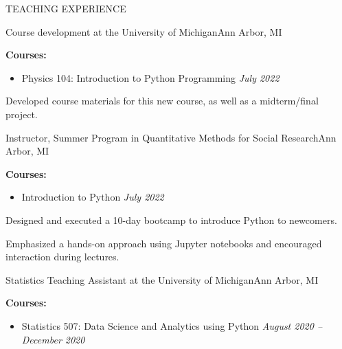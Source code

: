 \documentclass{resume} %
\begin{document}
\begin{rSection}{TEACHING EXPERIENCE} 
%
\begin{rSubsection}{Course development at the University of Michigan}{Ann Arbor, MI}{}{}
\item \textbf{Courses:}
%
    \begin{itemize}[itemsep=-0.4em]
        \vspace*{-0.5em}
        \item Physics 104: Introduction to Python Programming \hfill \textit{July 2022}
    \end{itemize}

\item Developed course materials for this new course, as well as a midterm/final project.

\end{rSubsection} 
%
\begin{rSubsection}{Instructor, Summer Program in Quantitative Methods for Social Research}{Ann Arbor, MI}{}{}
\item \textbf{Courses:}
%
    \begin{itemize}[itemsep=-0.4em]
        \vspace*{-0.5em}
        \item Introduction to Python \hfill \textit{July 2022}
    \end{itemize}

\item Designed and executed a 10-day bootcamp to introduce Python to newcomers. 

\item Emphasized a hands-on approach using Jupyter notebooks and encouraged interaction during lectures.

\end{rSubsection} 
%
\begin{rSubsection}{Statistics Teaching Assistant at the University of Michigan}{Ann Arbor, MI}{}{}
\item \textbf{Courses:}
%
    \begin{itemize}[itemsep=-0.4em]
        \vspace*{-0.5em}
        \item Statistics 507: Data Science and Analytics using Python \hfill \textit{August 2020 -- December 2020}
    \end{itemize}


\end{rSubsection}
\end{rSection}
\end{document}
